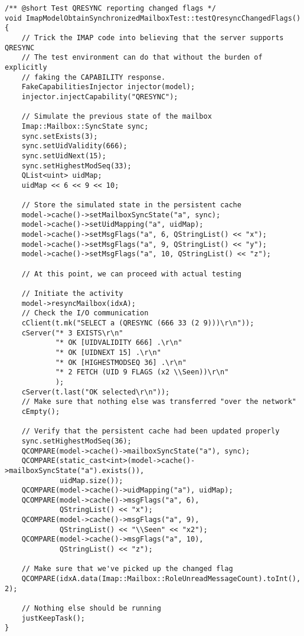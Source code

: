 \documentclass[trojita]{subfiles}
\begin{document}
\begin{verbatim}
/** @short Test QRESYNC reporting changed flags */
void ImapModelObtainSynchronizedMailboxTest::testQresyncChangedFlags()
{
    // Trick the IMAP code into believing that the server supports QRESYNC
    // The test environment can do that without the burden of explicitly
    // faking the CAPABILITY response.
    FakeCapabilitiesInjector injector(model);
    injector.injectCapability("QRESYNC");

    // Simulate the previous state of the mailbox
    Imap::Mailbox::SyncState sync;
    sync.setExists(3);
    sync.setUidValidity(666);
    sync.setUidNext(15);
    sync.setHighestModSeq(33);
    QList<uint> uidMap;
    uidMap << 6 << 9 << 10;

    // Store the simulated state in the persistent cache
    model->cache()->setMailboxSyncState("a", sync);
    model->cache()->setUidMapping("a", uidMap);
    model->cache()->setMsgFlags("a", 6, QStringList() << "x");
    model->cache()->setMsgFlags("a", 9, QStringList() << "y");
    model->cache()->setMsgFlags("a", 10, QStringList() << "z");

    // At this point, we can proceed with actual testing

    // Initiate the activity
    model->resyncMailbox(idxA);
    // Check the I/O communication
    cClient(t.mk("SELECT a (QRESYNC (666 33 (2 9)))\r\n"));
    cServer("* 3 EXISTS\r\n"
            "* OK [UIDVALIDITY 666] .\r\n"
            "* OK [UIDNEXT 15] .\r\n"
            "* OK [HIGHESTMODSEQ 36] .\r\n"
            "* 2 FETCH (UID 9 FLAGS (x2 \\Seen))\r\n"
            );
    cServer(t.last("OK selected\r\n"));
    // Make sure that nothing else was transferred "over the network"
    cEmpty();

    // Verify that the persistent cache had been updated properly
    sync.setHighestModSeq(36);
    QCOMPARE(model->cache()->mailboxSyncState("a"), sync);
    QCOMPARE(static_cast<int>(model->cache()->mailboxSyncState("a").exists()),
             uidMap.size());
    QCOMPARE(model->cache()->uidMapping("a"), uidMap);
    QCOMPARE(model->cache()->msgFlags("a", 6),
             QStringList() << "x");
    QCOMPARE(model->cache()->msgFlags("a", 9),
             QStringList() << "\\Seen" << "x2");
    QCOMPARE(model->cache()->msgFlags("a", 10),
             QStringList() << "z");

    // Make sure that we've picked up the changed flag
    QCOMPARE(idxA.data(Imap::Mailbox::RoleUnreadMessageCount).toInt(), 2);

    // Nothing else should be running
    justKeepTask();
}
\end{verbatim}
\end{document}
